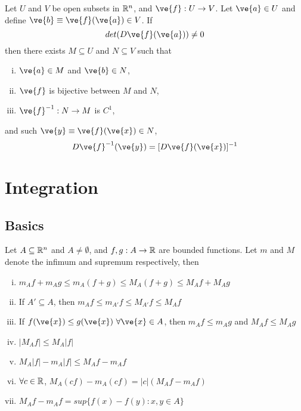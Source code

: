 \documentclass[11pt]{article}
\begin{document}
			\begin{theorem}
				Let $U$ and $V$ be open subsets in $\mathbb{R}^n$, and $\ve{f}: U \to V$. Let $\ve{a} \in U$ and define $\ve{b} \equiv \ve{f}(\ve{a}) \in V$. If
				\begin{equation}
					det(D\ve{f}(\ve{a})) \neq 0
				\end{equation}
				then there exists $M \subseteq U$ and $N \subseteq V$ such that
				\begin{enumerate}[(i)]
					\item $\ve{a} \in M$ and $\ve{b} \in N$,
					\item $\ve{f}$ is bijective between $M$ and $N$,
					\item $\ve{f}^{-1}: N \to M$ is $C^1$,
				\end{enumerate}
					and  such $\ve{y} \equiv \ve{f}(\ve{x}) \in N$,
					\begin{equation}
						D \ve{f}^{-1} (\ve{y}) = [D \ve{f} (\ve{x})]^{-1}
					\end{equation}
			\end{theorem}
	
	\section{Integration}
		\subsection{Basics}
			\begin{theorem}
				Let $A \subseteq \mathbb{R}^n$ and $A \neq \emptyset$, and $f, g: A \to \mathbb{R}$ are bounded functions. Let $m$ and $M$ denote the infimum and supremum respectively, then
				\begin{enumerate}[(i)]
					\item $m_A f + m_A g \leq m_A (f+g) \leq M_A (f+g) \leq M_A f + M_A g$
					\item If $A' \subseteq A$, then $m_A f \leq m_{A'} f \leq M_{A'} f\leq M_A f$
					\item If $f(\ve{x}) \leq g(\ve{x})\ \forall \ve{x} \in A$, then $m_A f \leq m_A g$ and $M_A f \leq M_A g$
					\item $|M_A f| \leq M_A |f|$
					\item $M_A |f| - m_A |f| \leq M_A f - m_A f$
					\item $\forall c \in \mathbb{R}$, $M_A (cf) - m_A (cf) = |c| (M_A f - m_A f)$
					\item $M_A f - m_A f = sup\{f(x) - f(y): x, y \in A\}$
				\end{enumerate}
			\end{theorem}
			
\end{document}

